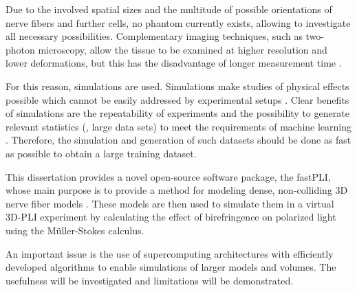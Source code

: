 Due to the involved spatial sizes and the multitude of possible orientations of nerve fibers and further cells, no phantom currently exists, allowing to investigate all necessary possibilities.
Complementary imaging techniques, such as two-photon microscopy, allow the tissue to be examined at higher resolution and lower deformations, but this has the disadvantage of longer measurement time \cite{Costantini2020, Costantini2021}.
\par
% 
For this reason, simulations are used.
Simulations make studies of physical effects possible which cannot be easily addressed by experimental setups \cite{Callaghan2019, Menzel2020}.
Clear benefits of simulations are the repeatability of experiments and the possibility to generate relevant statistics (\ie{}, large data sets) to meet \eg{} the requirements of machine learning \cite{Ginsburger2018, ginsburgerDis2019}.
Therefore, the simulation and generation of such datasets should be done as fast as possible to obtain a large training dataset.
\par
%
This dissertation provides a novel open-source software package, the \ac{fastPLI}, whose main purpose is to provide a method for modeling dense, non-colliding 3D nerve fiber models \cite{Matuschke2019, Matuschke2021, Reuter2019}.
These models are then used to simulate them in a virtual \ac{3D-PLI} experiment by calculating the effect of birefringence on polarized light using the M{\"u}ller-Stokes calculus.
\par
% 
An important issue is the use of supercomputing architectures with efficiently developed algorithms to enable simulations of larger models and volumes.
The usefulness will be investigated and limitations will be demonstrated.
